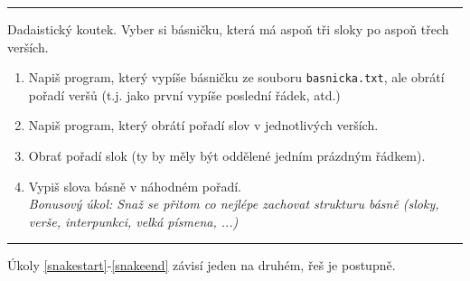 \documentclass[a4paper,10pt]{article}
\begin{document}

\hrule
Dadaistický koutek.
Vyber si básničku, která má aspoň tři sloky po aspoň třech verších.

\begin{enumerate}[resume]

\item Napiš program, který vypíše básničku ze souboru \verb+basnicka.txt+,
    ale obrátí pořadí veršů (t.j. jako první vypíše poslední řádek, atd.)

\item Napiš program, který obrátí pořadí slov v jednotlivých verších.

\item Obrať pořadí slok (ty by měly být oddělené jedním prázdným řádkem).

\item Vypiš slova básně v náhodném pořadí.
    \\\emph{Bonusový úkol: Snaž se přitom co nejlépe zachovat strukturu básně
        (sloky, verše, interpunkci, velká písmena, ...)}

\end{enumerate}

\hrule
Úkoly \ref{snakestart}-\ref{snakeend} závisí jeden na druhém, řeš je postupně.
\end{document}
